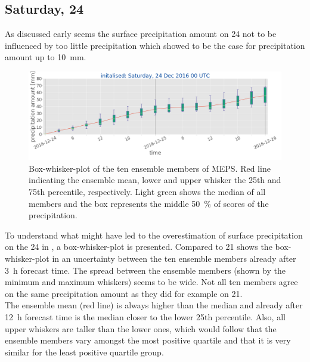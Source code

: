 \subsection{Saturday, \SI{24}{\dec}}\label{sec:2412:surface}
As discussed early seems the surface precipitation amount on \SI{24}{\dec} not to be influenced by too little precipitation which \cite{muller_arome-metcoop:_2017} showed to be the case for precipitation amount up to \SI{10}{\mm}. 
\begin{figure}[t]
	\includegraphics[width=\textwidth]{./fig_boxplot_sfc/20161224_0}
	\caption{Box-whisker-plot of the ten ensemble members of MEPS. Red line indicating the ensemble mean, lower and upper whisker the 25th and 75th percentile, respectively. Light green shows the median of all members and the box represents the middle \SI{50}{\percent} of scores of the precipitation.}\label{fig:boxplt24}
\end{figure}
To understand what might have led to the overestimation of surface precipitation on the \SI{24}{\dec} in , a box-whisker-plot is presented. Compared to \SI{21}{\dec} shows the box-whisker-plot in  an uncertainty between the ten ensemble members already after \SI{3}{\hour} forecast time. The spread between the ensemble members (shown by the minimum and maximum whiskers) seems to be wide. Not all ten members agree on the same precipitation amount as they did for example on \SI{21}{\dec}.
\\
The ensemble mean (red line) is always higher than the median and already after \SI{12}{\hour} forecast time is the median closer to the lower 25th percentile. Also, all upper whiskers are taller than the lower ones, which would follow that the ensemble members vary amongst the most positive quartile and that it is very similar for the least positive quartile group.
